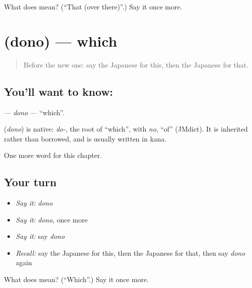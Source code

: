 \begin{tcolorbox}[breakable,colback=teal!4,colframe=teal!35!black,title={Before you move on}]
What does  mean? (\textquotedblleft{}That (over there)\textquotedblright{}.) Say it once more.
\end{tcolorbox}
\section[\texorpdfstring{\ja{どの} (dono)}{どの (dono)}]{ (dono) — which}

\label{lesson:JA-C83-dono}



\begin{quote}
Before the new one: say the Japanese for this, then the Japanese for that.
\end{quote}

\subsection*{You'll want to know: }
\textbf{} — \emph{dono} — \textquotedblleft{}which\textquotedblright{}.

\begin{cousinweb}
\textbf{} (\emph{dono}) is native: \emph{do-}, the root of \textquotedblleft{}which\textquotedblright{}, with \emph{no}, \textquotedblleft{}of\textquotedblright{} (JMdict). It is inherited rather than borrowed, and is usually written in kana.
\end{cousinweb}

\begin{grammarlens}[title={What you've built}]
One more word for this chapter.
\end{grammarlens}

\subsection*{Your turn}
\begin{itemize}
\raggedright
  \item \emph{Say it:} \emph{dono}
  \item \emph{Say it:} \emph{dono}, once more
  \item \emph{Say it:} say \emph{dono}
  \item \emph{Recall:} say the Japanese for this, then the Japanese for that, then say \emph{dono} again
\end{itemize}

\begin{tcolorbox}[breakable,colback=teal!4,colframe=teal!35!black,title={Before you move on}]
What does  mean? (\textquotedblleft{}Which\textquotedblright{}.) Say it once more.
\end{tcolorbox}
